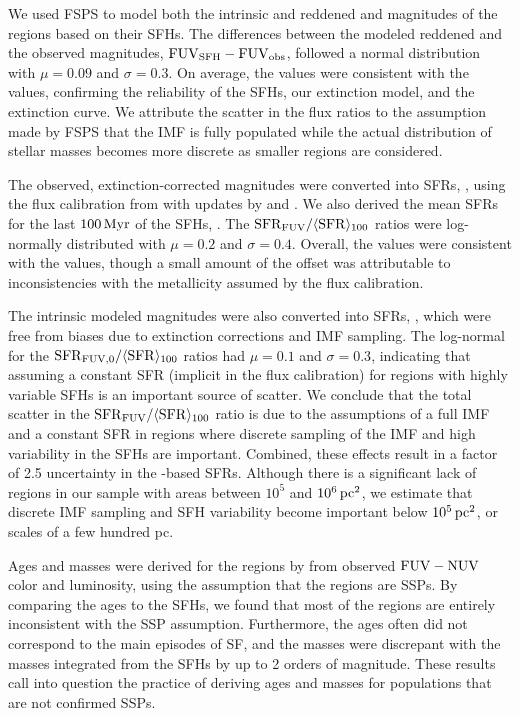 We used FSPS to model both the intrinsic and reddened \fuv{} and \nuv{} magnitudes of
the regions based on their SFHs. The differences between the modeled reddened
and the observed \fuv{} magnitudes, $\mathrm{FUV}_{\mathrm{SFH}} - \mathrm{FUV}_{\mathrm{obs}}$, followed a
normal distribution with $\mu=0.09$ and $\sigma=0.3$. On average, the
\fuvsfh{} values were consistent with the \fuvobs{}
values, confirming the reliability of the SFHs, our extinction model, and the
\citet{Cardelli:1989} extinction curve. We attribute the scatter in the flux
ratios to the assumption made by FSPS that the IMF is fully populated while the
actual distribution of stellar masses becomes more discrete as smaller regions
are considered.

The observed, extinction-corrected \fuv{} magnitudes were converted into SFRs,
\sfrfuv{}, using the \fuv{} flux calibration from \citet{Kennicutt:1998}
with updates by \citet{Hao:2011} and \citet{Murphy:2011}. We also derived the mean
SFRs for the last $100\,\mathrm{Myr}$ of the SFHs, \sfroneh{}. The $\mathrm{SFR}_{\mathrm{FUV}} / \langle\mathrm{SFR}\rangle_{100}$
ratios were log-normally distributed with $\mu=0.2$
and $\sigma=0.4$. Overall, the \sfrfuv{} values were consistent with
the \sfroneh{} values, though a small amount of the
offset was attributable to inconsistencies with the metallicity assumed by the
flux calibration.

The intrinsic modeled \fuv{} magnitudes were also converted into SFRs,
\sfrfuvz{}, which were free from biases due to extinction
corrections and IMF sampling. The log-normal for the
$\mathrm{SFR}_{\mathrm{FUV},0} / \langle\mathrm{SFR}\rangle_{100}$ ratios had $\mu=0.1$
and $\sigma=0.3$, indicating that assuming a constant SFR (implicit in the flux
calibration) for regions with highly variable SFHs is an important source of
scatter. We conclude that the total scatter in the $\mathrm{SFR}_{\mathrm{FUV}} / \langle\mathrm{SFR}\rangle_{100}$ ratio
is due to the assumptions of a full IMF and a
constant SFR in regions where discrete sampling of the IMF and high variability
in the SFHs are important. Combined, these effects result in a factor of 2.5
uncertainty in the \fuv{}-based SFRs. Although there is a significant lack of
regions in our sample with areas between $10^5$ and $10^6\,\mathrm{pc}^2$, we
estimate that discrete IMF sampling and SFH variability become important below
$10^5\,\mathrm{pc}^2$, or scales of a few hundred pc.

Ages and masses were derived for the regions by  from
observed $\mathrm{FUV} - \mathrm{NUV}$ color and \fuv{} luminosity, using the assumption that
the regions are SSPs. By comparing the ages to the SFHs, we found that most of
the regions are entirely inconsistent with the SSP assumption. Furthermore, the
ages often did not correspond to the main episodes of SF, and the masses were
discrepant with the masses integrated from the SFHs by up to 2 orders of
magnitude. These results call into question the practice of deriving ages and
masses for populations that are not confirmed SSPs.

